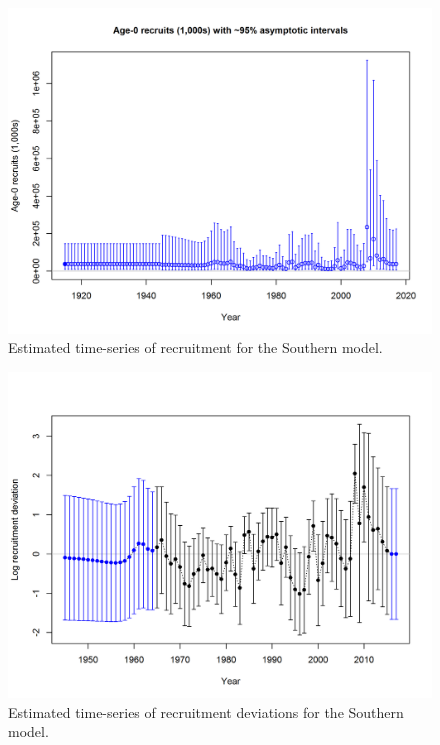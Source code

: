 \documentclass[12pt,]{article}
\begin{document}
\FloatBarrier

\begin{figure}[htbp]
\centering
\includegraphics{r4ss/plots_mod2/ts11_Age-0_recruits_(1000s)_with_95_asymptotic_intervals.png}
\caption{Estimated time-series of recruitment for the Southern model.
\label{fig:recruits1.S}}
\end{figure}

\FloatBarrier

\begin{figure}[htbp]
\centering
\includegraphics{r4ss/plots_mod2/recdevs2_withbars.png}
\caption{Estimated time-series of recruitment deviations for the
Southern model. \label{fig:recdevs1.S}}
\end{figure}
\end{document}
